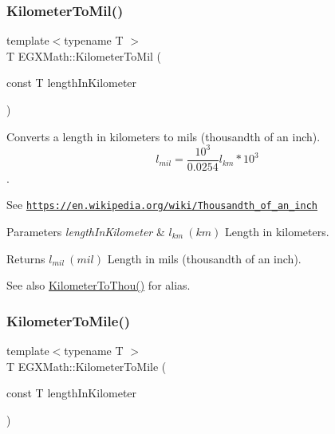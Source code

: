 \subsubsection{\texorpdfstring{Kilometer\+To\+Mil()}{KilometerToMil()}}
{\footnotesize\ttfamily template$<$typename T $>$ \\
T E\+G\+X\+Math\+::\+Kilometer\+To\+Mil (\begin{DoxyParamCaption}\item[{const T}]{length\+In\+Kilometer }\end{DoxyParamCaption})}



Converts a length in kilometers to mils (thousandth of an inch). \[ l_{mil}= \frac{10^{3}}{0.0254} l_{km} * 10^{3} \]. 

See \href{https://en.wikipedia.org/wiki/Thousandth_of_an_inch}{\tt https\+://en.\+wikipedia.\+org/wiki/\+Thousandth\+\_\+of\+\_\+an\+\_\+inch} 
\begin{DoxyParams}{Parameters}
{\em length\+In\+Kilometer} & $ l_{km}\ (km)$ Length in kilometers. \\
\hline
\end{DoxyParams}
\begin{DoxyReturn}{Returns}
$ l_{mil}\ (mil)$ Length in mils (thousandth of an inch). 
\end{DoxyReturn}
\begin{DoxySeeAlso}{See also}
\mbox{\hyperlink{group___e_g_x_math-_conversions-_length_conversions-_s_i-_kilometer-_imperial_gabcd7d2e467bc0e80c61257ba641d0f48}{Kilometer\+To\+Thou()}} for alias. 
\end{DoxySeeAlso}
\mbox{\label{group___e_g_x_math-_conversions-_length_conversions-_s_i-_kilometer-_imperial_ga781cd502fe13eb76e4e6b8e1fa7d55ed}} 
\subsubsection{\texorpdfstring{Kilometer\+To\+Mile()}{KilometerToMile()}}
{\footnotesize\ttfamily template$<$typename T $>$ \\
T E\+G\+X\+Math\+::\+Kilometer\+To\+Mile (\begin{DoxyParamCaption}\item[{const T}]{length\+In\+Kilometer }\end{DoxyParamCaption})}




